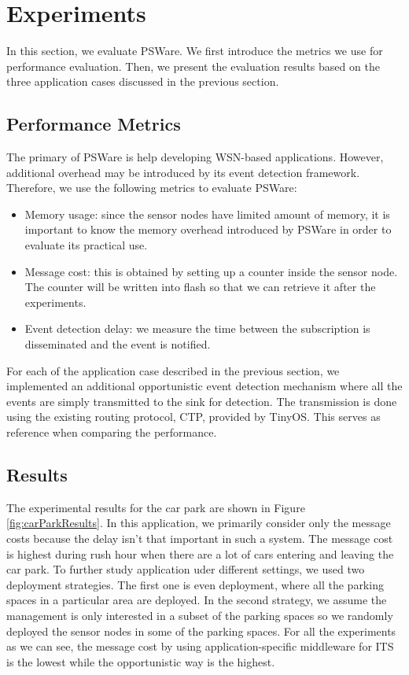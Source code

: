 \section{Experiments}
\label{sec:experiments}
In this section, we evaluate PSWare. We first introduce the metrics we use for performance evaluation. Then, we present the evaluation results based on the three application cases discussed in the previous section. 

\subsection{Performance Metrics}
The primary of PSWare is help developing WSN-based applications. However, additional overhead may be introduced by its event detection framework. Therefore, we use the following metrics to evaluate PSWare:
\begin{itemize}
\item Memory usage: since the sensor nodes have limited amount of memory, it is important to know the memory overhead introduced by PSWare in order to evaluate its practical use. 
\item Message cost: this is obtained by setting up a counter inside the sensor node. The counter will be written into flash so that we can retrieve it after the experiments.
\item Event detection delay: we measure the time between the subscription is disseminated and the event is notified.
\end{itemize}

For each of the application case described in the previous section, we implemented an additional opportunistic event detection mechanism where all the events are simply transmitted to the sink for detection. The transmission is done using the existing routing protocol, CTP, provided by TinyOS. This serves as reference when comparing the performance.

\subsection{Results}
The experimental results for the car park are shown in Figure \ref{fig:carParkResults}. In this application, we primarily consider only the message costs because the delay isn't that important in such a system. The message cost is highest during rush hour when there are a lot of cars entering and leaving the car park. To further study application uder different settings, we used two deployment strategies. The first one is even deployment, where all the parking spaces in a particular area are deployed. In the second strategy, we assume the management is only interested in a subset of the parking spaces so we randomly deployed the sensor nodes in some of the parking spaces. For all the experiments as we can see, the message cost by using application-specific middleware for ITS is the lowest while the opportunistic way is the highest.

